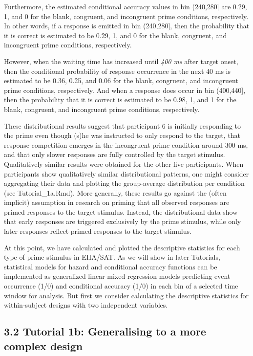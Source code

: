 \documentclass[
  man, donotrepeattitle,floatsintext]{apa6}
\begin{document}
Furthermore, the estimated conditional accuracy values in bin (240,280{]} are 0.29, 1, and 0 for the blank, congruent, and incongruent prime conditions, respectively. In other words, if a response is emitted in bin (240,280{]}, then the probability that it is correct is estimated to be 0.29, 1, and 0 for the blank, congruent, and incongruent prime conditions, respectively.

However, when the waiting time has increased until \emph{400 ms} after target onset, then the conditional probability of response occurrence in the next 40 ms is estimated to be 0.36, 0.25, and 0.06 for the blank, congruent, and incongruent prime conditions, respectively. And when a response does occur in bin (400,440{]}, then the probability that it is correct is estimated to be 0.98, 1, and 1 for the blank, congruent, and incongruent prime conditions, respectively.

These distributional results suggest that participant 6 is initially responding to the prime even though (s)he was instructed to only respond to the target, that response competition emerges in the incongruent prime condition around 300 ms, and that only slower responses are fully controlled by the target stimulus. Qualitatively similar results were obtained for the other five participants. When participants show qualitatively similar distributional patterns, one might consider aggregating their data and plotting the group-average distribution per condition (see Tutorial\_1a.Rmd). More generally, these results go against the (often implicit) assumption in research on priming that all observed responses are primed responses to the target stimulus. Instead, the distributional data show that early responses are triggered exclusively by the prime stimulus, while only later responses reflect primed responses to the target stimulus.

At this point, we have calculated and plotted the descriptive statistics for each type of prime stimulus in EHA/SAT. As we will show in later Tutorials, statistical models for hazard and conditional accuracy functions can be implemented as generalized linear mixed regression models predicting event occurrence (1/0) and conditional accuracy (1/0) in each bin of a selected time window for analysis. But first we consider calculating the descriptive statistics for within-subject designs with two independent variables.

\subsection{3.2 Tutorial 1b: Generalising to a more complex design}\label{tutorial-1b-generalising-to-a-more-complex-design}
\end{document}
